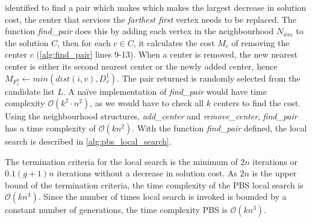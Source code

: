 \citeauthor{pullan_memetic_2008} identified to find a pair which makes which makes the largest decrease in solution cost, the center that services the \emph{farthest first} vertex needs to be replaced. The function \emph{find\_pair} does this by adding each vertex in the neighbourhood $N_{wm}$ to the solution $C$, then for each $c\in C$, it calculates the cost $M_c$ of removing the center $c$ (\cref{alg:find_pair} lines 9-13). When a center is removed, the new nearest center is either its second nearest center or the newly added center, hence $M_{F_v^0}\gets min(dist(i,v),D_v^1)$. The pair returned is randomly selected from the candidate list $L$. A na\"{i}ve implementation of \emph{find\_pair} would have time complexity $\mathcal{O}(k^2\cdot n^2)$, as we would have to check all $k$ centers to find the cost. Using the neighbourhood structures, \emph{add\_center} and \emph{remove\_center}, \emph{find\_pair} has a time complexity of $\mathcal{O}(kn^2)$. With the function \emph{find\_pair} defined, the local search is described in \cref{alg:pbs_local_search}.



The termination criteria for the local search is the minimum of $2n$ iterations or $0.1(g + 1)n$ iterations without a decrease in solution cost. As $2n$ is the upper bound of the termination criteria, the time complexity of the PBS local search is $\mathcal{O}(kn^3)$. Since the number of times local search is invoked is bounded by a constant number of generations, the time complexity PBS is $\mathcal{O}(kn^3)$.